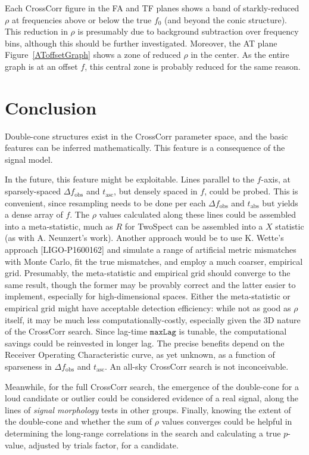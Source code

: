 \documentclass{article}
\begin{document}
Each CrossCorr figure in the FA and TF planes shows a band of starkly-reduced $\rho$ at frequencies above or below the true $f_0$ (and beyond the conic structure).
This reduction in $\rho$ is presumably due to background subtraction over frequency bins, although this should be further investigated.
Moreover, the AT plane Figure~\ref{AToffsetGraph} shows a zone of reduced $\rho$ in the center.
As the entire graph is at an offset $f$, this central zone is probably reduced for the same reason.

\section{Conclusion}

Double-cone structures exist in the CrossCorr parameter space, and the basic features can be inferred mathematically.
This feature is a consequence of the signal model.

In the future, this feature might be exploitable.
Lines parallel to the $f$-axis, at sparsely-spaced $\Delta f_\mathrm{obs}$ and $t_\mathrm{asc}$, but densely spaced in $f$, could be probed.
This is convenient, since resampling needs to be done per each $\Delta f_\mathrm{obs}$ and $t_\mathrm{abs}$ but yields a dense array of $f$.
The $\rho$ values calculated along these lines could be assembled into a meta-statistic, much as $R$ for TwoSpect can be assembled into a $X$ statistic (as with A. Neunzert's work).
Another approach would be to use K. Wette's approach [LIGO-P1600162] and simulate a range of artificial metric mismatches with Monte Carlo, fit the true mismatches, and employ a much coarser, empirical grid.
Presumably, the meta-statistic and empirical grid should converge to the same result, though the former may be provably correct and the latter easier to implement, especially for high-dimensional spaces.
Either the meta-statistic or empirical grid might have acceptable detection efficiency: while not as good as $\rho$ itself, it may be much less computationally-costly, especially given the 3D nature of the CrossCorr search.
Since lag-time $\texttt{maxLag}$ is tunable, the computational savings could be reinvested in longer lag.
The precise benefits depend on the Receiver Operating Characteristic curve, as yet unknown, as a function of sparseness in $\Delta f_\mathrm{obs}$ and $t_\mathrm{asc}$.
An all-sky CrossCorr search is not inconceivable.

Meanwhile, for the full CrossCorr search, the emergence of the double-cone for a loud candidate or outlier could be considered evidence of a real signal, along the lines of \textit{signal morphology} tests in other groups.
Finally, knowing the extent of the double-cone and whether the sum of $\rho$ values converges could be helpful in determining the long-range correlations in the search and calculating a true $p$-value, adjusted by trials factor, for a candidate.
\end{document}
